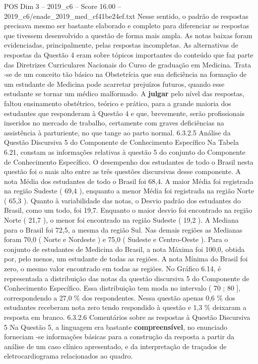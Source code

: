 \begin{textsample}{POS Dim 3 – 2019\_c6 – Score 16.00 – 2019\_c6/enade\_2019\_med\_cf41be24ef.txt}
Nesse sentido, o padrão de respostas precisava mesmo ser bastante elaborado e completo para diferenciar as respostas que tivessem desenvolvido a questão de forma mais ampla.
As notas baixas foram evidenciadas, principalmente, pelas respostas incompletas.
As alternativas de respostas da Questão 4 eram sobre tópicos importantes do conteúdo que faz parte das Diretrizes Curriculares Nacionais do Curso de graduação em Medicina.
Trata -se de um conceito tão básico na Obstetrícia que sua deficiência na formação de um estudante de Medicina pode acarretar prejuízos futuros, quando esse estudante se tornar um médico malformado.
A \textbf{julgar} pelo nível das respostas, faltou ensinamento obstétrico, teórico e prático, para a grande maioria dos estudantes que responderam à Questão 4 e que, brevemente, serão profissionais inseridos no mercado de trabalho, certamente com graves deficiências na assistência à parturiente, no que tange ao parto normal. 6.3.2.5 Análise da Questão Discursiva 5 do Componente de Conhecimento Específico Na Tabela 6.21, constam as informações relativas à questão 5 do conjunto do Componente de Conhecimento Específico.
O desempenho dos estudantes de todo o Brasil nesta questão foi o mais alto entre as três questões discursivas desse componente.
A nota Média dos estudantes de todo o Brasil foi 68,4.
A maior Média foi registrada na região Sudeste ( 69,4 ), enquanto a menor Média foi registrada na região Norte ( 65,3 ).
Quanto à variabilidade das notas, o Desvio padrão dos estudantes do Brasil, como um todo, foi 19,7.
Enquanto o maior desvio foi encontrado na região Norte ( 21,7 ), o menor foi encontrado na região Sudeste ( 19,2 ).
A Mediana para o Brasil foi 72,5, a mesma da região Sul.
Nas demais regiões as Medianas foram 70,0 ( Norte e Nordeste ) e 75,0 ( Sudeste e Centro-Oeste ).
Para o conjunto de estudantes de Medicina do Brasil, a nota Máxima foi 100,0, obtida por, pelo menos, um estudante de todas as regiões.
A nota Mínima do Brasil foi zero, o mesmo valor encontrado em todas as regiões.
No Gráfico 6.14, é representada a distribuição das notas da questão discursiva 5 do Componente de Conhecimento Específico.
Essa distribuição tem moda no intervalo ( 70 ; 80 ], correspondendo a 27,0 \% dos respondentes.
Nessa questão apenas 0,6 \% dos estudantes receberam nota zero tendo respondido à questão e 1,3 \% deixaram a resposta em branco. 6.3.2.6 Comentários sobre as respostas à Questão Discursiva 5 Na Questão 5, a linguagem era bastante \textbf{compreensível}, no enunciado forneciam -se informações básicas para a construção da resposta a partir da análise de um caso clínico apresentado, e da interpretação de traçados de eletrocardiograma relacionados ao quadro.

\end{textsample}

